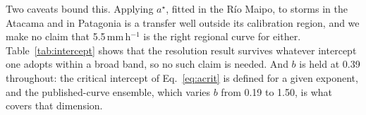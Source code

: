 \documentclass[authoryear,preprint,review,12pt]{elsarticle}
\begin{document}
Two caveats bound this. Applying $a^\star$, fitted in the R\'io Maipo, to storms in
the Atacama and in Patagonia is a transfer well outside its calibration region, and we make no claim that 5.5\,mm\,h$^{-1}$ is the right regional curve for either. Table~\ref{tab:intercept} shows that the resolution result survives whatever intercept one adopts within a broad band, so no such claim is needed. And $b$ is held at 0.39 throughout: the critical intercept of
Eq.~\ref{eq:acrit} is defined for a given exponent, and the published-curve
ensemble, which varies $b$ from 0.19 to 1.50, is what covers that dimension.

\begin{table}[ht]
\centering
\caption{Critical I--D intercept $a_\mathrm{crit}$ (Eq.~\ref{eq:acrit}, $b=0.39$) per
event and forcing resolution, and the band of intercepts in which resolution alone
decides detection.}
\label{tab:intercept}

\end{table}
\end{document}
